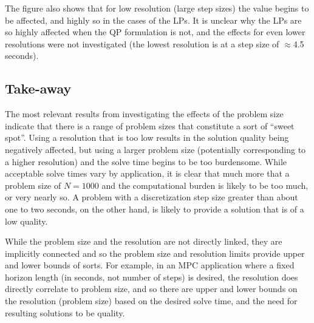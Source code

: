 The figure also shows that for low resolution (large step sizes) the value begins to be affected, and highly so in the cases of the LPs. It is unclear why the LPs are so highly affected when the QP formulation is not, and the effects for even lower resolutions were not investigated (the lowest resolution is at a step size of $\approx$4.5 seconds).


\subsection{Take-away} \label{ssec:prob_size_take_aways}

The most relevant results from investigating the effects of the problem size indicate that there is a range of problem sizes that constitute a sort of  ``sweet spot''. Using a resolution that is too low results in the solution quality being negatively affected, but using a larger problem size (potentially corresponding to a higher resolution) and the solve time begins to be too burdensome. While acceptable solve times vary by application, it is clear that much more that a problem size of $N=1000$ and the computational burden is likely to be too much, or very nearly so. A problem with a discretization step size greater than about one to two seconds, on the other hand, is likely to provide a solution that is of a low quality.

While the problem size and the resolution are not directly linked, they are implicitly connected and so the problem size and resolution limits provide upper and lower bounds of sorts. For example, in an MPC application where a fixed horizon length (in seconds, not number of steps) is desired, the resolution does directly correlate to problem size, and so there are upper and lower bounds on the resolution (problem size) based on the desired solve time, and the need for resulting solutions to be quality.
